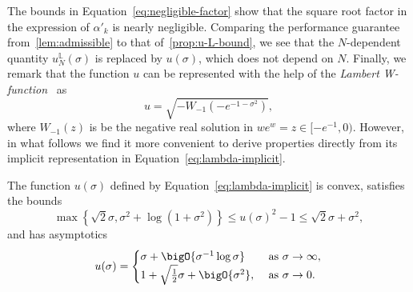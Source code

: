 \documentclass{article}
\begin{document}
The bounds in Equation~\eqref{eq:negligible-factor} show that the square root factor in the expression of $\alpha'_k$ is nearly negligible.
Comparing the performance guarantee from~\cref{lem:admissible} to that of~\cref{prop:u-L-bound}, we see that the $N$-dependent quantity $u_N^{\mathbb L}(\sigma)$ is replaced by $u(\sigma)$, which does not depend on $N$.
Finally, we remark that the function $u$ can be represented with the help of the \emph{Lambert W-function}~\citep{Corless_Gonnet_Hare_Jeffrey_Knuth_1996} as
\[
u=\sqrt{-W_{-1}(-e^{-1-\sigma^2})},
\]
where $W_{-1}(z)$ is be the negative real solution in $we^{w}=z\in[-e^{-1},0)$.
However, in what follows we find it more convenient to derive properties directly from its implicit representation in Equation~\eqref{eq:lambda-implicit}.
\begin{lemma}\label{lem:lambda}
    The function $u(\sigma)$ defined by Equation~\eqref{eq:lambda-implicit} is convex, satisfies the bounds
    \[
    \max\left\{\sqrt2\sigma,\sigma^2+\log(1+\sigma^2)\right\}\le u(\sigma)^2-1\le %
    \sqrt2\sigma+\sigma^2,
    \]
    and has asymptotics
    \[
    u(\sigma)=\begin{cases}
        \sigma+\bigO{\sigma^{-1}\log\sigma}&\text{ as }\sigma\to\infty,\\
        1+\sqrt{\frac12}\sigma+\bigO{\sigma^2},&\text{ as }\sigma\to0.
    \end{cases}
    \]
\end{lemma}
\end{document}
